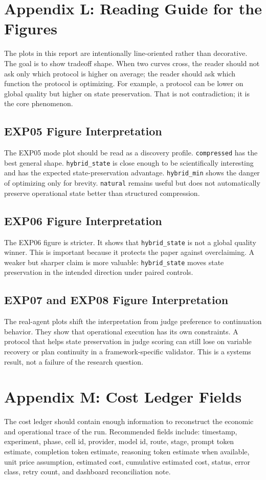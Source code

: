 \documentclass[11pt]{article}
\begin{document}
\section{Appendix L: Reading Guide for the Figures}
The plots in this report are intentionally line-oriented rather than decorative. The goal is to show tradeoff shape. When two curves cross, the reader should not ask only which protocol is higher on average; the reader should ask which function the protocol is optimizing. For example, a protocol can be lower on global quality but higher on state preservation. That is not contradiction; it is the core phenomenon.

\subsection{EXP05 Figure Interpretation}
The EXP05 mode plot should be read as a discovery profile. \texttt{compressed} has the best general shape. \texttt{hybrid\_state} is close enough to be scientifically interesting and has the expected state-preservation advantage. \texttt{hybrid\_min} shows the danger of optimizing only for brevity. \texttt{natural} remains useful but does not automatically preserve operational state better than structured compression.

\subsection{EXP06 Figure Interpretation}
The EXP06 figure is stricter. It shows that \texttt{hybrid\_state} is not a global quality winner. This is important because it protects the paper against overclaiming. A weaker but sharper claim is more valuable: \texttt{hybrid\_state} moves state preservation in the intended direction under paired controls.

\subsection{EXP07 and EXP08 Figure Interpretation}
The real-agent plots shift the interpretation from judge preference to continuation behavior. They show that operational execution has its own constraints. A protocol that helps state preservation in judge scoring can still lose on variable recovery or plan continuity in a framework-specific validator. This is a systems result, not a failure of the research question.

\section{Appendix M: Cost Ledger Fields}
The cost ledger should contain enough information to reconstruct the economic and operational trace of the run. Recommended fields include: timestamp, experiment, phase, cell id, provider, model id, route, stage, prompt token estimate, completion token estimate, reasoning token estimate when available, unit price assumption, estimated cost, cumulative estimated cost, status, error class, retry count, and dashboard reconciliation note.
\end{document}
